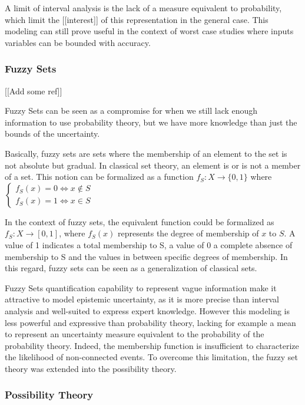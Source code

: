 A limit of interval analysis is the lack of a measure equivalent to probability, which limit the [[interest]] of this representation in the general case. This modeling can still prove useful in the context of worst case studies where inputs variables can be bounded with accuracy.

\subsubsection{Fuzzy Sets}

[[Add some ref]]

Fuzzy Sets can be seen as a compromise for when we still lack enough information to use probability theory, but we have more knowledge than just the bounds of the uncertainty.

Basically, fuzzy sets are sets where the membership of an element to the set is not absolute but gradual.
In classical set theory, an element is or is not a member of a set. This notion can be formalized as a function $f_S: X \rightarrow \{0,1\}$ where 
$\left\{
 		 \begin{array}{rcr}
			f_S(x) = 0 \Leftrightarrow x \not\in S\\
			f_S(x) = 1 \Leftrightarrow x \in S
		\end{array}
	\right. $

In the context of fuzzy sets, the equivalent function could be formalized as $f_S: X \rightarrow [0, 1]$, where $f_S(x)$ represents the degree of membership of $x$ to $S$. A value of 1 indicates a total membership to S, a value of 0 a complete absence of membership to S and the values in between specific degrees of membership.
In this regard, fuzzy sets can be seen as a generalization of classical sets.

Fuzzy Sets quantification capability to represent vague information make it attractive to model epistemic uncertainty, as it is more precise than interval analysis and well-suited to express expert knowledge. However this modeling is less powerful and expressive than probability theory, lacking for example a mean to represent an uncertainty measure equivalent to the probability of the probability theory. Indeed, the membership function is insufficient to characterize the likelihood of non-connected events.
To overcome this limitation, the fuzzy set theory was extended into the possibility theory.

\subsubsection{Possibility Theory}

